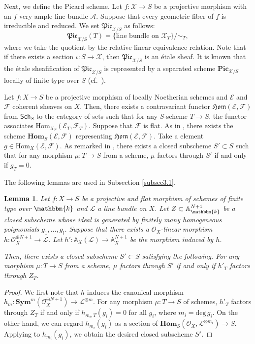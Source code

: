 \documentclass[12pt,twoside]{amsart}
\newtheorem{lem}[thm]{Lemma}
\theoremstyle{definition}
\begin{document}
Next, we define the Picard scheme.
Let $f\colon \mathscr{X}\to S$ be a projective morphism with an $f$-very ample line bundle $\mathscr{A}$. 
Suppose that every geometric fiber of $f$ is irreducible and reduced.
We set $\mathfrak{Pic}_{\mathscr{X}/S}$ as follows:  
\[
\mathfrak{Pic}_{\mathscr{X}/S}(T)=\{\text{line bundle on $\mathscr{X}_T$}\}/\sim_T,
\]
where we take the quotient by the relative linear equivalence relation.
Note that if there exists a section $\iota\colon S\to \mathscr{X}$, then $\mathfrak{Pic}_{\mathscr{X}/S}$ is an \'etale sheaf.
It is known that the \'etale sheafification of $\mathfrak{Pic}_{\mathscr{X}/S}$ is represented by a separated scheme $\mathbf{Pic}_{\mathscr{X}/S}$ locally of finite type over $S$ (cf.~\cite[\S9]{FGA}).



Let $f\colon X\to S$ be a projective morphism of locally Noetherian schemes and $\mathcal{E}$ and $\mathcal{F}$ coherent sheaves on $X$.
Then, there exists a contravariant functor $\mathfrak{Hom}(\mathcal{E},\mathcal{F})$  from $\mathsf{Sch}_S$ to the category of sets such that for any $S$-scheme $T\to S$, the functor associates $\mathrm{Hom}_{X_T}(\mathcal{E}_T,\mathcal{F}_T)$.
Suppose that $\mathcal{F}$ is flat.
As in \cite[Theorem 5.8]{FGA}, there exists the scheme $\mathbf{Hom}_S(\mathcal{E},\mathcal{F})$ representing $\mathfrak{Hom}(\mathcal{E},\mathcal{F})$.
Take a element $g\in \mathrm{Hom}_{X}(\mathcal{E},\mathcal{F})$.
As remarked in \cite[Remark 5.9]{FGA}, there exists a closed subscheme $S'\subset S$ such that for any morphism $\mu\colon T\to S$ from a scheme, $\mu$ factors through $S'$ if and only if $g_{T}=0$.

The following lemmas are used in Subsection \ref{subsec3.1}.
\begin{lem}\label{lem--closed--cone}
    Let $f\colon X\to S$ be a projective and flat morphism of schemes of finite type over $\mathbbm{k}$ and $\mathscr{L}$ a line bundle on $X$.
    Let $Z\subset \mathbb{A}^{N+1}_{\mathbbm{k}}$ be a closed subscheme whose ideal is generated by finitely many homogeneous polynomials $g_1,\ldots, g_l$.
    Suppose that there exists a $\mathcal{O}_{X}$-linear morphism $h\colon\mathcal{O}_{X}^{\oplus N+1}\to \mathscr{L}$.
    Let $h'\colon \mathbb{A}_{X}(\mathscr{L})\to \mathbb{A}_{X}^{N+1}$ be the morphism induced by $h$.

    Then, there exists a closed subscheme $S'\subset S$ satisfying the following.
For any morphism $\mu\colon T\to S$ from a scheme, $\mu$ factors through $S'$ if and only if $h'_T$ factors through $Z_T$.
\end{lem}
\begin{proof}
    We first note that $h$ induces the canonical morphism $h_m\colon\mathbf{Sym}^m(\mathcal{O}_{X}^{\oplus N+1})\to \mathscr{L}^{\otimes m}$.
    For any morphism $\mu\colon T\to S$ of schemes, $h'_T$ factors through $Z_T$ if and only if $h_{m_i,T}(g_i)=0$ for all $g_i$, where $m_i=\mathrm{deg}\,g_i$.
    On the other hand, we can regard $h_{m_i}(g_i)$ as a section of $\mathbf{Hom}_S(\mathcal{O}_X,\mathscr{L}^{\otimes m_i})\to S$.
    Applying \cite[Remark 5.9]{FGA} to $h_{m_i}(g_i)$, we obtain the desired closed subscheme $S'$.
\end{proof}
\end{document}
